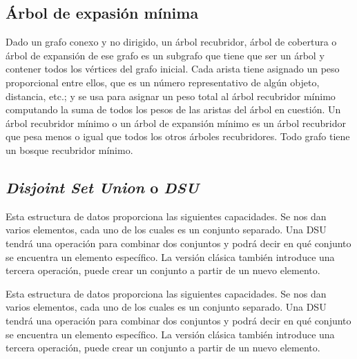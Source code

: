 \subsection{Árbol de expasión mínima}

Dado un grafo conexo y no dirigido, un árbol recubridor, árbol de cobertura o árbol de expansión de ese grafo es un subgrafo que tiene que ser un árbol y contener todos los vértices del grafo inicial. Cada arista tiene asignado un peso proporcional entre ellos, que es un número representativo de algún objeto, distancia, etc.; y se usa para asignar un peso total al árbol recubridor mínimo computando la suma de todos los pesos de las aristas del árbol en cuestión. Un árbol recubridor mínimo o un árbol de expansión mínimo es un árbol recubridor que pesa menos o igual que todos los otros árboles recubridores. Todo grafo tiene un bosque recubridor mínimo. 

\subsection{\emph{Disjoint Set Union} o \emph{DSU}}
Esta estructura de datos proporciona las siguientes capacidades. Se nos dan varios elementos, cada uno de los cuales es un conjunto separado. Una DSU tendrá una operación para combinar dos conjuntos y podrá decir en qué conjunto se encuentra un elemento específico. La versión clásica también introduce una tercera operación, puede crear un conjunto a partir de un nuevo elemento.

Esta estructura de datos proporciona las siguientes capacidades. Se nos dan varios elementos, cada uno de los cuales es un conjunto separado. Una DSU tendrá una operación para combinar dos conjuntos y podrá decir en qué conjunto se encuentra un elemento específico. La versión clásica también introduce una tercera operación, puede crear un conjunto a partir de un nuevo elemento.

